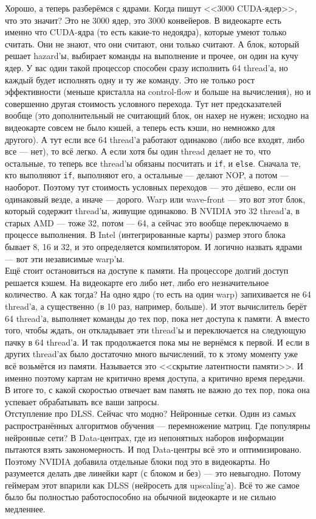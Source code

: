 \documentclass{article}
\begin{document}
    Хорошо, а теперь разберёмся с ядрами. Когда пишут <<3000 CUDA-ядер>>, что это значит? Это не 3000 ядер, это 3000 конвейеров. В видеокарте есть именно что CUDA-ядра (то есть какие-то недоядра), которые умеют только считать. Они не знают, что они считают, они только считают. А блок, который решает hazard'ы, выбирает команды на выполнение и прочее, он один на кучу ядер. У вас один такой процессор способен сразу исполнить 64 thread'а, но каждый будет исполнять одну и ту же команду. Это не только рост эффективности (меньше кристалла на control-flow и больше на вычисления), но и совершенно другая стоимость условного перехода. Тут нет предсказателей вообще (это дополнительный не считающий блок, он нахер не нужен; исходно на видеокарте совсем не было кэшей, а теперь есть кэши, но немножко для другого). А тут если все 64 thread'а работают одинаково (либо все входят, либо все --- нет), то всё легко. А если хотя бы один thread делает не то, что остальные, то теперь все thread'ы обязаны посчитать и \texttt{if}, и \texttt{else}. Сначала те, кто выполняют \texttt{if}, выполняют его, а остальные --- делают NOP, а потом --- наоборот. Поэтому тут стоимость условных переходов --- это дёшево, если он одинаковый везде, а иначе --- дорого. Warp или wave-front --- это вот этот блок, который содержит thread'ы, живущие одинаково. В NVIDIA это 32 thread'а, в старых AMD --- тоже 32, потом --- 64, а сейчас это вообще переключаемо в процессе выполнения. В Intel (интегрированные карты) размер этого блока бывает 8, 16 и 32, и это определяется компилятором. И логично назвать ядрами --- вот эти независимые warp'ы.\\
    Ещё стоит остановиться на доступе к памяти. На процессоре долгий доступ решается кэшем. На видеокарте его либо нет, либо его незначительное количество. А как тогда? На одно ядро (то есть на один warp) запихивается не 64 thread'а, а существенно (в 10 раз, например, больше). И этот вычислитель берёт 64 thread'а, выполняет команды до тех пор, пока нет доступа к памяти. А вместо того, чтобы ждать, он откладывает эти thread'ы и переключается на следующую пачку в 64 thread'а. И так продолжается пока мы не вернёмся к первой. И если в других thread'ах было достаточно много вычислений, то к этому моменту уже всё возьмётся из памяти. Называется это <<скрытие латентности памяти>>. И именно поэтому картам не критично время доступа, а критично время передачи. В итоге то, с какой скоростью отвечает вам память не важно до тех пор, пока она успевает обрабатывать все ваши запросы.\\
    Отступление про DLSS. Сейчас что модно? Нейронные сетки. Один из самых распространённых алгоритмов обучения --- перемножение матриц. Где популярны нейронные сети? В Data-центрах, где из непонятных наборов информации пытаются взять закономерность. И под Data-центры всё это и оптимизировано. Поэтому NVIDIA добавила отдельные блоки под это в видеокарты. Но разумеется делать две линейки карт (с блоком и без) --- это невыгодно. Потому геймерам этот впарили как DLSS (нейросеть для upscaling'а). Всё то же самое было бы полностью работоспособно на обычной видеокарте и не сильно медленнее.
\end{document}
